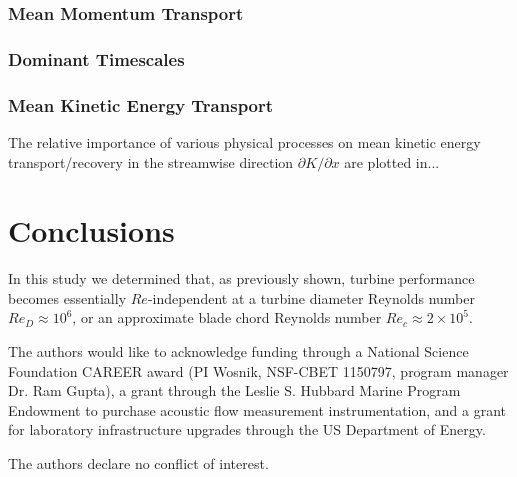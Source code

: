 \documentclass[energies,article,accept,moreauthors,pdftex,12pt,a4paper]{mdpi}
\def \p{\partial}
\begin{document}

\subsubsection{Mean Momentum Transport}



\subsubsection{Dominant Timescales}


\subsubsection{Mean Kinetic Energy Transport}

The relative importance of various physical processes on mean kinetic energy
transport/recovery in the streamwise direction $\p K / \p x$ are plotted in...



\section{Conclusions}

In this study we determined that, as previously shown, turbine performance
becomes essentially $Re$-independent at a turbine diameter Reynolds number $Re_D
\approx 10^6$, or an approximate blade chord Reynolds number $Re_c \approx 2
\times 10^5$.



The authors would like to acknowledge funding through a National Science
Foundation CAREER award (PI Wosnik, NSF-CBET 1150797, program manager Dr. Ram
Gupta), a grant through the Leslie S. Hubbard Marine Program Endowment to
purchase acoustic flow measurement instrumentation, and a grant for laboratory
infrastructure upgrades through the US Department of Energy.


The authors declare no conflict of interest.




\end{document}
